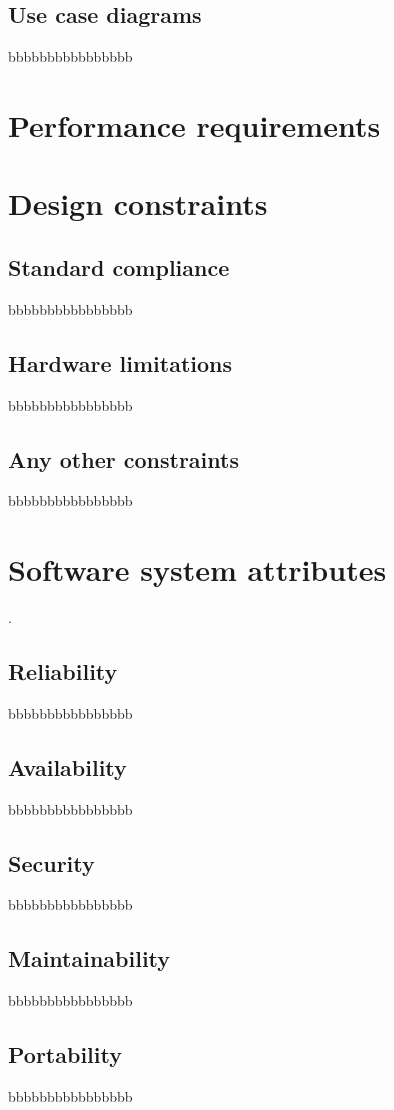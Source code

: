 \subsection{Use case diagrams}
\label{subsec:use_case_diagrams}%
bbbbbbbbbbbbbbbb

\section{Performance requirements}
\label{sec:performance_requirements}%

\section{Design constraints}
\label{sec:design_constraints}%

\subsection{Standard compliance}
\label{subsec:standard compliance}%
bbbbbbbbbbbbbbbb

\subsection{Hardware limitations}
\label{subsec:hardware_limitations}%
bbbbbbbbbbbbbbbb

\subsection{Any other constraints}
\label{subsec:software_interfaces}%
bbbbbbbbbbbbbbbb

\section{Software system attributes}
\label{sec:software system_attributes}%
.
\subsection{Reliability}
\label{subsec:reliability}%
bbbbbbbbbbbbbbbb

\subsection{Availability}
\label{subsec:availability}%
bbbbbbbbbbbbbbbb

\subsection{Security}
\label{subsec:security}%
bbbbbbbbbbbbbbbb

\subsection{Maintainability}
\label{subsec:maintainability}%
bbbbbbbbbbbbbbbb

\subsection{Portability}
\label{subsec:portability}%
bbbbbbbbbbbbbbbb



